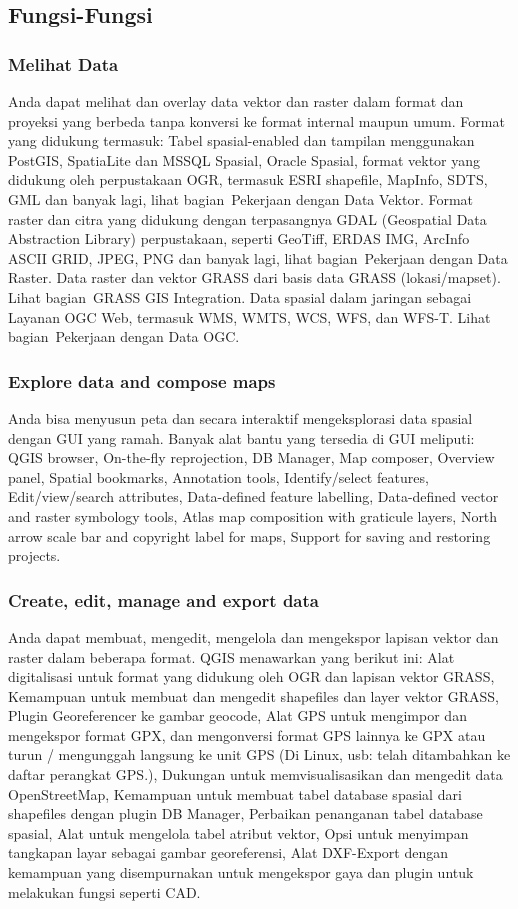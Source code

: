 \subsection{Fungsi-Fungsi}
\subsubsection {Melihat Data}
Anda dapat melihat dan overlay data vektor dan raster dalam format dan proyeksi yang berbeda tanpa konversi ke format internal maupun umum. Format yang didukung termasuk:
Tabel spasial-enabled dan tampilan menggunakan PostGIS, SpatiaLite dan MSSQL Spasial, Oracle Spasial, format vektor yang didukung oleh perpustakaan OGR, termasuk ESRI shapefile, MapInfo, SDTS, GML dan banyak lagi, lihat bagian Pekerjaan dengan Data Vektor.
Format raster dan citra yang didukung dengan terpasangnya GDAL (Geospatial Data Abstraction Library) perpustakaan, seperti GeoTiff, ERDAS IMG, ArcInfo ASCII GRID, JPEG, PNG dan banyak lagi, lihat bagian Pekerjaan dengan Data Raster.
Data raster dan vektor GRASS dari basis data GRASS (lokasi/mapset). Lihat bagian GRASS GIS Integration.
Data spasial dalam jaringan sebagai Layanan OGC Web, termasuk WMS, WMTS, WCS, WFS, dan WFS-T. Lihat bagian Pekerjaan dengan Data OGC.
\subsubsection {Explore data and compose maps}
Anda bisa menyusun peta dan secara interaktif mengeksplorasi data spasial dengan GUI yang ramah. Banyak alat bantu yang tersedia di GUI meliputi: QGIS browser, On-the-fly reprojection, DB Manager, Map composer, Overview panel, Spatial bookmarks, Annotation tools, Identify/select features, Edit/view/search attributes, Data-defined feature labelling, Data-defined vector and raster symbology tools, Atlas map composition with graticule layers, North arrow scale bar and copyright label for maps, Support for saving and restoring projects.
\subsubsection{Create, edit, manage and export data}
Anda dapat membuat, mengedit, mengelola dan mengekspor lapisan vektor dan raster dalam beberapa format. QGIS menawarkan yang berikut ini: Alat digitalisasi untuk format yang didukung oleh OGR dan lapisan vektor GRASS, Kemampuan untuk membuat dan mengedit shapefiles dan layer vektor GRASS, Plugin Georeferencer ke gambar geocode, Alat GPS untuk mengimpor dan mengekspor format GPX, dan mengonversi format GPS lainnya ke GPX atau turun / mengunggah langsung ke unit GPS (Di Linux, usb: telah ditambahkan ke daftar perangkat GPS.), Dukungan untuk memvisualisasikan dan mengedit data OpenStreetMap, Kemampuan untuk membuat tabel database spasial dari shapefiles dengan plugin DB Manager, Perbaikan penanganan tabel database spasial, Alat untuk mengelola tabel atribut vektor, Opsi untuk menyimpan tangkapan layar sebagai gambar georeferensi, Alat DXF-Export dengan kemampuan yang disempurnakan untuk mengekspor gaya dan plugin untuk melakukan fungsi seperti CAD.

